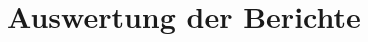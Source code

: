 
\chapter{Auswertung der Berichte}
\newpage
\null
\newpage
\null
\newpage
\null
\newpage
\null
\newpage
\null
\newpage
\null
\newpage
\null
